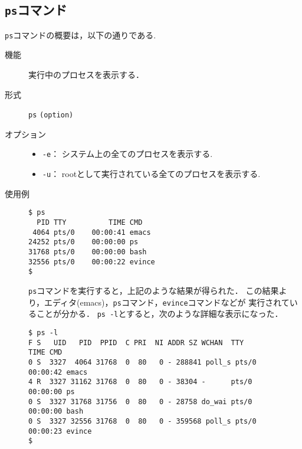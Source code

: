 \documentclass[a4j,11pt]{jarticle}
\begin{document}
\subsection{\texttt{ps}コマンド}
\verb|ps|コマンドの概要は，以下の通りである.
\begin{description}
  \item[機能]
    実行中のプロセスを表示する．
  \item[形式]
    \verb|ps| \verb|(option)|
  \item[オプション]
    \begin{itemize}
      \item \verb|-e|：  システム上の全てのプロセスを表示する.
      \item \verb|-u|：  rootとして実行されている全てのプロセスを表示する.
    \end{itemize}
  \item[使用例]
    \begin{verbatim}
$ ps
  PID TTY          TIME CMD
 4064 pts/0    00:00:41 emacs
24252 pts/0    00:00:00 ps
31768 pts/0    00:00:00 bash
32556 pts/0    00:00:22 evince
$ 
    \end{verbatim}
\verb|ps|コマンドを実行すると，上記のような結果が得られた．
この結果より，エディタ(emacs)，\verb|ps|コマンド，\verb|evince|コマンドなどが
実行されていることが分かる．
\verb|ps -l|とすると，次のような詳細な表示になった．
\begin{verbatim}
$ ps -l
F S   UID   PID  PPID  C PRI  NI ADDR SZ WCHAN  TTY          TIME CMD
0 S  3327  4064 31768  0  80   0 - 288841 poll_s pts/0   00:00:42 emacs
4 R  3327 31162 31768  0  80   0 - 38304 -      pts/0    00:00:00 ps
0 S  3327 31768 31756  0  80   0 - 28758 do_wai pts/0    00:00:00 bash
0 S  3327 32556 31768  0  80   0 - 359568 poll_s pts/0   00:00:23 evince
$ 
\end{verbatim}
\end{description}






\end{document}
